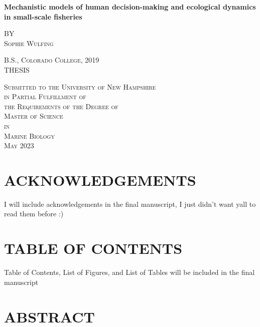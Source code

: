 \documentclass[
]{article}
\author{}
\date{\vspace{-2.5em}}
\begin{document}

\begin{center}
    
\textbf{\Large Mechanistic models of human decision-making and ecological dynamics in small-scale fisheries}
    
\textsc{BY \\ Sophie Wulfing}
\vspace{3 mm}

\textsc{B.S., Colorado College, 2019 \\ }
\vspace{3 mm}
\textsc{THESIS}

\vspace{3 mm}
\textsc{Submitted to the University of New Hampshire \\ in Partial Fulfillment of \\ the Requirements of the Degree of \\ Master of Science \\ in \\ Marine Biology \\ May 2023}

\end{center}

\newpage


\hypertarget{acknowledgements}{%
\section{ACKNOWLEDGEMENTS}\label{acknowledgements}}

I will include acknowledgements in the final manuscript, I just didn't want yall to read them before :)

\newpage

\hypertarget{table-of-contents}{%
\section{TABLE OF CONTENTS}\label{table-of-contents}}

Table of Contents, List of Figures, and List of Tables will be included in the final manuscript

\newpage

\hypertarget{abstract}{%
\section{ABSTRACT}\label{abstract}}
\end{document}
